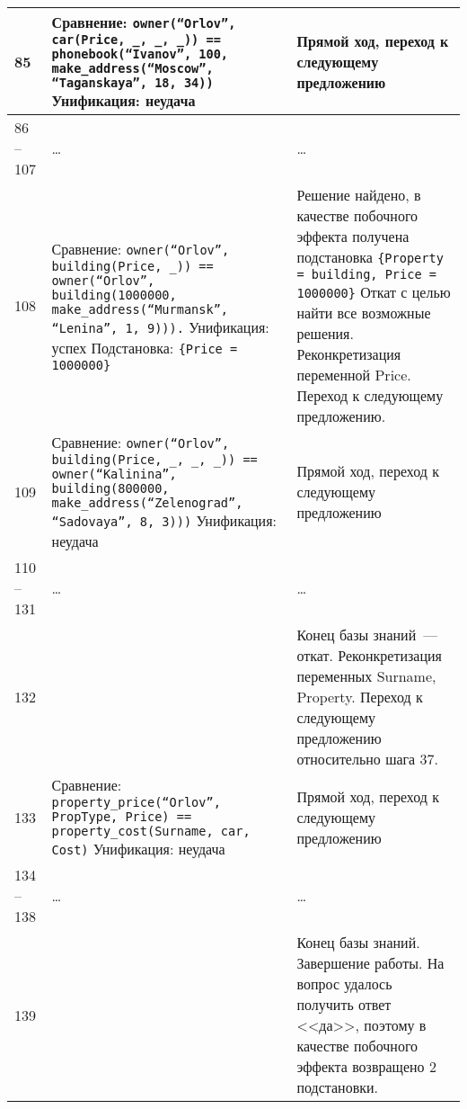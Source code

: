 \begin{xltabular}{\textwidth}{|l|X|Y|}
		85 &
		Сравнение:\newline
		\texttt{owner(``Orlov'', car(Price, \_, \_, \_)) == phonebook(``Ivanov'', 100, make\_address(``Moscow'', ``Taganskaya'', 18, 34))} \newline\newline
		Унификация: неудача &
		Прямой ход, переход к следующему предложению \\ \hline
		
		86 -- 107 & \centering \dots & \dots \\ \hline
		
		108 &
		Сравнение:\newline
		\texttt{owner(``Orlov'', building(Price, \_)) == owner(``Orlov'', building(1000000, make\_address(``Murmansk'', ``Lenina'', 1, 9))).} \newline\newline
		Унификация: успех \newline\newline
		Подстановка: \texttt{\{Price = 1000000\}} & 
		Решение найдено, в качестве побочного эффекта получена подстановка \texttt{\{Property = building, Price = 1000000\}} \newline\newline 
		Откат с целью найти все возможные решения.
		Реконкретизация переменной Price.
		Переход к следующему предложению.\\ \hline
		
		109 &
		Сравнение:\newline
		\texttt{owner(``Orlov'', building(Price, \_, \_, \_)) == owner(``Kalinina'', building(800000, make\_address(``Zelenograd'', ``Sadovaya'', 8, 3)))} \newline\newline
		Унификация: неудача &
		Прямой ход, переход к следующему предложению \\ \hline
		
		110 -- 131 & \centering \dots & \dots \\ \hline
		
		132 &
		 &
		Конец базы знаний~--- откат.
		Реконкретизация переменных Surname, Property.
		Переход к следующему предложению относительно шага 37.\\ \hline
		
		133 &
		Сравнение:\newline
		\texttt{property\_price(``Orlov'', PropType, Price) == property\_cost(Surname, car, Cost)} \newline\newline
		Унификация: неудача &
		Прямой ход, переход к следующему предложению \\ \hline
				
		134 -- 138 & \centering \dots & \dots \\ \hline
		
		139 &
		&
		Конец базы знаний.
		Завершение работы. \newline\newline
		На вопрос удалось получить ответ <<да>>, поэтому в качестве побочного эффекта возвращено 2 подстановки.
		\\ \hline
	\end{xltabular}